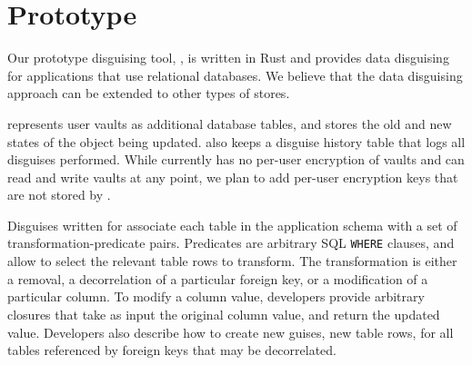 \section{Prototype}
\label{sec:proto}
%
Our prototype disguising tool, \sys, is written in Rust and 
provides data disguising for applications that use relational databases.
%
We believe that the data disguising approach can be extended to other types of stores.
%

%
\sys represents user vaults as additional database tables, and stores the old and new states
of the object being updated. \sys also keeps a disguise history table that logs all disguises
performed.
While \sys currently has no per-user encryption of vaults and can read and
write vaults at any point, we plan to add per-user encryption keys that are not stored by \sys.

%
Disguises written for \sys associate each table in the application schema with a set of
transformation-predicate pairs. Predicates are arbitrary SQL \texttt{WHERE} clauses, and allow \sys
to select the relevant table rows to transform. The transformation is either a removal, a
decorrelation of a particular foreign key, or a modification of a particular column. To modify a
column value, developers provide arbitrary closures that take as input the original column value,
and return the updated value.
%
Developers also describe how to create new guises, \ie new table rows, for all
tables referenced by foreign keys that may be decorrelated.

\iffalse
\sys also provides a specification of the end-state after it applies a sequence of
disguises; this allows developers to double-check that their disguises achieve their privacy
transformation goals.
%
To do so, \sys automatically generates a sequence of materialized view filters that, when applied on top of each
other, correspond to the state achieved by composing the disguises. 
Developers specify assertions (\eg all objects belonging to departing user Bob have
been removed) that \sys ensures holds on the materialized view specification.

\sys's composition technique may reorder filters from one disguise with those from a subsequent disguise in order to achieve the
correct result.
%
\sys maps these filters directly to physical database operations (where reordering filters corresponds to
temporarily undoing vault entries). Thus, the developer can use the materialized view filters as a way to
test the correctness of \sys and their disguises prior to permanently altering the application database. 
\fi
